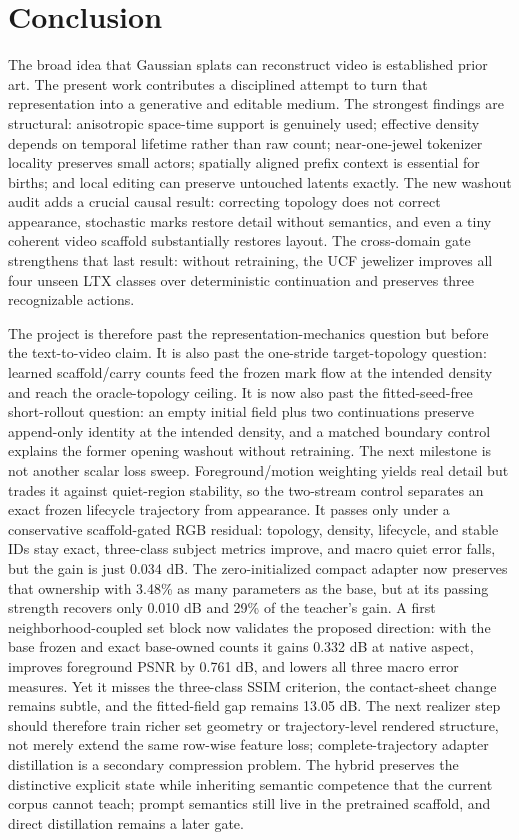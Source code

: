 \documentclass[10pt]{article}
\begin{document}
\section{Conclusion}

The broad idea that Gaussian splats can reconstruct video is established prior art. The present
work contributes a disciplined attempt to turn that representation into a generative and editable
medium. The strongest findings are structural: anisotropic space-time support is genuinely used;
effective density depends on temporal lifetime rather than raw count; near-one-jewel tokenizer
locality preserves small actors; spatially aligned prefix context is essential for births; and local
editing can preserve untouched latents exactly. The new washout audit adds a crucial causal result:
correcting topology does not correct appearance, stochastic marks restore detail without semantics,
and even a tiny coherent video scaffold substantially restores layout. The cross-domain gate
strengthens that last result: without retraining, the UCF jewelizer improves all four unseen LTX
classes over deterministic continuation and preserves three recognizable actions.

The project is therefore past the representation-mechanics question but before the text-to-video
claim. It is also past the one-stride target-topology question: learned scaffold/carry counts feed
the frozen mark flow at the intended density and reach the oracle-topology ceiling. It is now also
past the fitted-seed-free short-rollout question: an empty initial field plus two continuations
preserve append-only identity at the intended density, and a matched boundary control explains the
former opening washout without retraining. The next milestone is not another scalar loss sweep.
Foreground/motion weighting yields real detail but trades it against quiet-region stability, so the
two-stream control separates an exact frozen lifecycle trajectory from appearance. It passes only
under a conservative scaffold-gated RGB residual: topology, density, lifecycle, and stable IDs stay
exact, three-class subject metrics improve, and macro quiet error falls, but the gain is just
0.034 dB. The zero-initialized compact adapter now preserves that ownership with 3.48\% as many
parameters as the base, but at its passing strength recovers only 0.010 dB and 29\% of the
teacher's gain. A first neighborhood-coupled set block now validates the proposed direction: with
the base frozen and exact base-owned counts it gains 0.332 dB at native aspect, improves foreground
PSNR by 0.761 dB, and lowers all three macro error measures. Yet it misses the three-class SSIM
criterion, the contact-sheet change remains subtle, and the fitted-field gap remains 13.05 dB. The
next realizer step should therefore train richer set geometry or
trajectory-level rendered structure, not merely extend the same row-wise feature loss;
complete-trajectory adapter distillation is a secondary compression problem. The hybrid preserves
the distinctive explicit state while inheriting semantic competence that the current corpus cannot
teach; prompt semantics still live in the pretrained scaffold, and direct distillation remains a
later gate.
\end{document}
